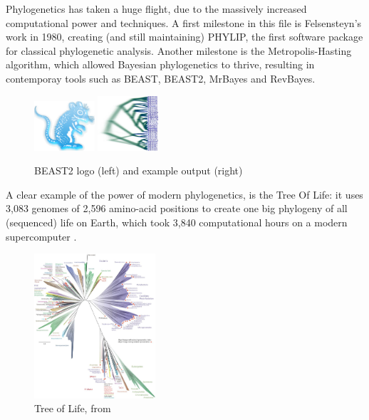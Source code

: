 Phylogenetics has taken a huge flight, due to the massively increased
computational power and techniques. A first milestone in this file is 
Felsensteyn's work in 1980, creating (and still maintaining) PHYLIP, 
the first software package for classical phylogenetic analysis.
Another milestone is the Metropolis-Hasting algorithm, which 
allowed Bayesian phylogenetics to thrive, resulting in
contemporay tools such as BEAST, BEAST2, MrBayes and RevBayes.

\begin{figure}[H]
  \includegraphics[width=0.2\textwidth]{beast_logo.png}
  \includegraphics[width=0.2\textwidth]{DensiTreeExample2.jpg}
  \caption{
    BEAST2 logo (left) and example output (right)
 }
  \label{fig:beast2}
\end{figure}

A clear example of the power of modern phylogenetics,
is the Tree Of Life: it uses 
3,083 genomes of 2,596 amino-acid positions 
to create one big phylogeny of all (sequenced) life on Earth,
which took 3,840 computational hours on a modern supercomputer \cite{hug2016new}.


\begin{figure}[H]
  \includegraphics[width=0.4\textwidth]{tree_of_life_2016.jpg}
  \caption{
    Tree of Life, from \cite{hug2016new}
 }
  \label{fig:tree_of_life}
\end{figure}

